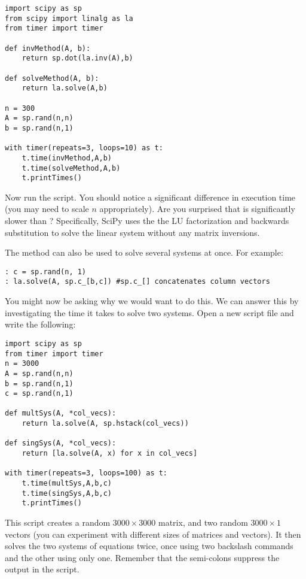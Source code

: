 \begin{lstlisting}
import scipy as sp
from scipy import linalg as la
from timer import timer

def invMethod(A, b):
    return sp.dot(la.inv(A),b)

def solveMethod(A, b):
    return la.solve(A,b)
    
n = 300
A = sp.rand(n,n)
b = sp.rand(n,1)

with timer(repeats=3, loops=10) as t:
	t.time(invMethod,A,b)
	t.time(solveMethod,A,b)
	t.printTimes()
\end{lstlisting}

Now run the script. You should notice a significant difference in execution time
(you may need to scale $n$ appropriately). Are you surprised that  is significantly slower than ?  Specifically, SciPy uses the
the LU factorization and backwards substitution to solve the linear system
without any matrix inversions. %

The  method can also be used to solve several systems at once. For example:

\begin{lstlisting}
: c = sp.rand(n, 1)
: la.solve(A, sp.c_[b,c]) #sp.c_[] concatenates column vectors
\end{lstlisting}

You might now be asking why we would want to do this. We can answer this by
investigating the time it takes to solve two systems. Open a new script file and
write the following:

\begin{lstlisting}
import scipy as sp
from timer import timer
n = 3000
A = sp.rand(n,n)
b = sp.rand(n,1)
c = sp.rand(n,1)

def multSys(A, *col_vecs):
    return la.solve(A, sp.hstack(col_vecs))
    
def singSys(A, *col_vecs):
    return [la.solve(A, x) for x in col_vecs]

with timer(repeats=3, loops=100) as t:
    t.time(multSys,A,b,c)
    t.time(singSys,A,b,c)
    t.printTimes()
\end{lstlisting}

This script creates a random $3000 \times 3000$ matrix, and two random $3000
\times 1$ vectors (you can experiment with different sizes of matrices and
vectors). It then solves the two systems of equations twice, once using two
backslash commands and the other using only one. Remember that the semi-colons
suppress the output in the script.

